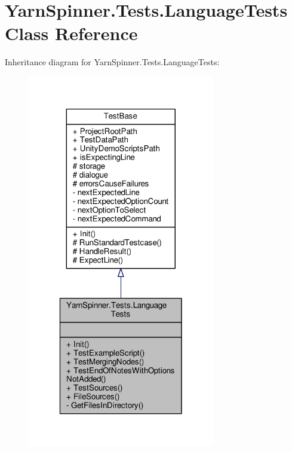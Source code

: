\hypertarget{a00120}{\section{Yarn\-Spinner.\-Tests.\-Language\-Tests Class Reference}
\label{a00120}
}


Inheritance diagram for Yarn\-Spinner.\-Tests.\-Language\-Tests\-:
\nopagebreak
\begin{figure}[H]
\begin{center}
\leavevmode
\includegraphics[width=232pt]{a00725}
\end{center}
\end{figure}


